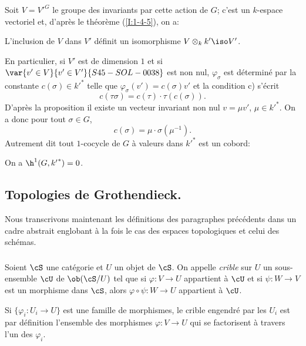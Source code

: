 Soit $V={V'}^G$ le groupe des invariants par cette action de $G$; c'est un 
$k$-espace vectoriel et, d'après le théorème (\ref{I:1-4-5}), on a:

\begin{propositiondotdash}\label{I:1-5-2}
L'inclusion de $V$ dans $V'$ définit un isomorphisme 
$V\otimes_k k' \iso V'$.
\end{propositiondotdash}

En particulier, si $V'$ est de dimension $1$ et si $\var{v'\in V}{v'\in V'}{S45-SOL-0038}$ est non nul, 
$\varphi_\sigma$ est déterminé par la constante 
$c(\sigma)\in {k'}^*$ telle que $\varphi_\sigma(v')=c(\sigma)v'$ et la 
condition c) s'écrit 
\[
  c(\tau\sigma) = c(\tau)\cdot \tau(c(\sigma))\text{.}
\]
D'après la proposition il existe un vecteur invariant non nul 
$v=\mu v'$, $\mu\in {k'}^*$. On a donc pour tout $\sigma\in G$, 
\[
  c(\sigma) = \mu\cdot \sigma(\mu^{-1})\text{.}
\]
Autrement dit tout $1$-cocycle de $G$ à valeurs dans ${k'}^*$ est un 
cobord: 

\begin{corollarydash}\label{I:1-5-3}
On a $\h^1(G,{k'}^*)=0$.
\end{corollarydash}










\subsection{Topologies de Grothendieck.}\label{I:1-6}

Nous transcrivons maintenant les définitions des paragraphes précédents 
dans un cadre abstrait englobant à la fois le cas des espaces topologiques 
et celui des schémas. 





\subsubsection{}\label{I:1-6-1}

Soient $\cS$ une catégorie et $U$ un objet de $\cS$. On appelle \emph{crible} 
sur $U$ un sous-ensemble $\cU$ de $\ob(\cS/U)$ tel que si $\varphi:V\to U$ 
appartient à $\cU$ et si $\psi:W\to V$ est un morphisme dans $\cS$, alors 
$\varphi\circ\psi:W\to U$ appartient à $\cU$. 

Si $\{\varphi_i:U_i\to U\}$ est une famille de morphismes, le crible 
engendré par les $U_i$ est par définition l'ensemble des morphismes 
$\varphi:V\to U$ qui se factorisent à travers l'un des $\varphi_i$. 

